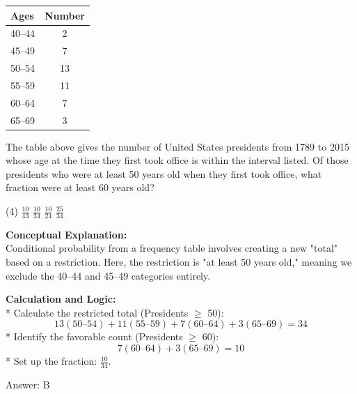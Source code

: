 \documentclass[11pt,paper=a4,answers]{exam}
\begin{document}
\begin{questions}
\question
\begin{center}
\begin{tabular}{|l|c|}
\hline
\textbf{Ages} & \textbf{Number} \\ \hline
40--44 & 2 \\ \hline
45--49 & 7 \\ \hline
50--54 & 13 \\ \hline
55--59 & 11 \\ \hline
60--64 & 7 \\ \hline
65--69 & 3 \\ \hline
\end{tabular}
\end{center}
The table above gives the number of United States presidents from 1789 to 2015 whose age at the time they first took office is within the interval listed. Of those presidents who were at least 50 years old when they first took office, what fraction were at least 60 years old?
\begin{tasks}(4)
    \task $\frac{10}{43}$
    \task $\frac{10}{34}$
    \task $\frac{10}{24}$
    \task $\frac{25}{34}$
\end{tasks}

\begin{solution}
\textbf{Conceptual Explanation:} \\
Conditional probability from a frequency table involves creating a new "total" based on a restriction. Here, the restriction is "at least 50 years old," meaning we exclude the 40--44 and 45--49 categories entirely.

\vspace{30pt}

\textbf{Calculation and Logic:} \\
* Calculate the restricted total (Presidents $\ge$ 50):
\[ 13 (50\text{--}54) + 11 (55\text{--}59) + 7 (60\text{--}64) + 3 (65\text{--}69) = 34 \]
* Identify the favorable count (Presidents $\ge$ 60):
\[ 7 (60\text{--}64) + 3 (65\text{--}69) = 10 \]
* Set up the fraction: $\frac{10}{34}$.

\vspace{30pt}

Answer: \colorbox{yellow!100}{B}
\end{solution}

\vspace{60pt}


\end{questions}
\end{document}
